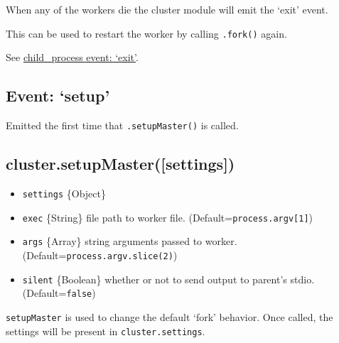 When any of the workers die the cluster module will emit the `exit'
event.

This can be used to restart the worker by calling \texttt{.fork()}
again.

\begin{Shaded}
\end{Shaded}

See \href{child_process.html\#child_process_event_exit}{child\_process
event: `exit'}.

\subsection{Event: `setup'}\label{event-setup}

Emitted the first time that \texttt{.setupMaster()} is called.

\subsection{cluster.setupMaster({[}settings{]})}\label{cluster.setupmastersettings}

\begin{itemize}
\itemsep1pt\parskip0pt
\item
  \texttt{settings} \{Object\}
\item
  \texttt{exec} \{String\} file path to worker file.
  (Default=\texttt{process.argv{[}1{]}})
\item
  \texttt{args} \{Array\} string arguments passed to worker.
  (Default=\texttt{process.argv.slice(2)})
\item
  \texttt{silent} \{Boolean\} whether or not to send output to parent's
  stdio. (Default=\texttt{false})
\end{itemize}

\texttt{setupMaster} is used to change the default `fork' behavior. Once
called, the settings will be present in \texttt{cluster.settings}.

